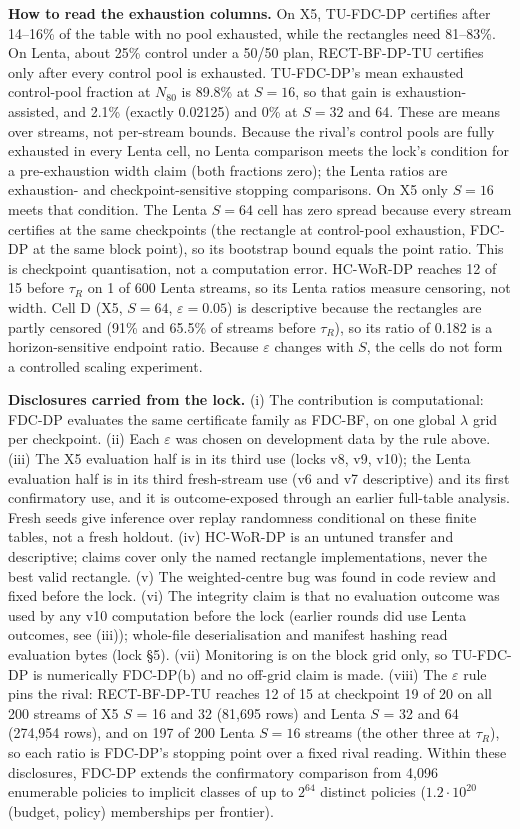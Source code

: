 \documentclass[sigconf,anonymous,review]{acmart}
\newcommand{\eps}{\varepsilon}
\begin{document}
\textbf{How to read the exhaustion columns.} On X5, TU-FDC-DP certifies after 14--16\% of the table with no pool exhausted, while the rectangles need 81--83\%. On Lenta, about 25\% control under a 50/50 plan, RECT-BF-DP-TU certifies only after every control pool is exhausted. TU-FDC-DP's mean exhausted control-pool fraction at $N_{80}$ is 89.8\% at $S = 16$, so that gain is exhaustion-assisted, and 2.1\% (exactly 0.02125) and 0\% at $S = 32$ and 64. These are means over streams, not per-stream bounds. Because the rival's control pools are fully exhausted in every Lenta cell, no Lenta comparison meets the lock's condition for a pre-exhaustion width claim (both fractions zero); the Lenta ratios are exhaustion- and checkpoint-sensitive stopping comparisons. On X5 only $S = 16$ meets that condition. The Lenta $S = 64$ cell has zero spread because every stream certifies at the same checkpoints (the rectangle at control-pool exhaustion, FDC-DP at the same block point), so its bootstrap bound equals the point ratio. This is checkpoint quantisation, not a computation error. HC-WoR-DP reaches 12 of 15 before $\tau_R$ on 1 of 600 Lenta streams, so its Lenta ratios measure censoring, not width. Cell D (X5, $S = 64$, $\eps = 0.05$) is descriptive because the rectangles are partly censored (91\% and 65.5\% of streams before $\tau_R$), so its ratio of 0.182 is a horizon-sensitive endpoint ratio. Because $\eps$ changes with $S$, the cells do not form a controlled scaling experiment.

\textbf{Disclosures carried from the lock.} (i) The contribution is computational: FDC-DP evaluates the same certificate family as FDC-BF, on one global $\lambda$ grid per checkpoint. (ii) Each $\eps$ was chosen on development data by the rule above. (iii) The X5 evaluation half is in its third use (locks v8, v9, v10); the Lenta evaluation half is in its third fresh-stream use (v6 and v7 descriptive) and its first confirmatory use, and it is outcome-exposed through an earlier full-table analysis. Fresh seeds give inference over replay randomness conditional on these finite tables, not a fresh holdout. (iv) HC-WoR-DP is an untuned transfer and descriptive; claims cover only the named rectangle implementations, never the best valid rectangle. (v) The weighted-centre bug was found in code review and fixed before the lock. (vi) The integrity claim is that no evaluation outcome was used by any v10 computation before the lock (earlier rounds did use Lenta outcomes, see (iii)); whole-file deserialisation and manifest hashing read evaluation bytes (lock \S5). (vii) Monitoring is on the block grid only, so TU-FDC-DP is numerically FDC-DP(b) and no off-grid claim is made. (viii) The $\eps$ rule pins the rival: RECT-BF-DP-TU reaches 12 of 15 at checkpoint 19 of 20 on all 200 streams of X5 $S$ = 16 and 32 (81,695 rows) and Lenta $S$ = 32 and 64 (274,954 rows), and on 197 of 200 Lenta $S = 16$ streams (the other three at $\tau_R$), so each ratio is FDC-DP's stopping point over a fixed rival reading. Within these disclosures, FDC-DP extends the confirmatory comparison from 4,096 enumerable policies to implicit classes of up to $2^{64}$ distinct policies ($1.2 \cdot 10^{20}$ (budget, policy) memberships per frontier).
\end{document}
